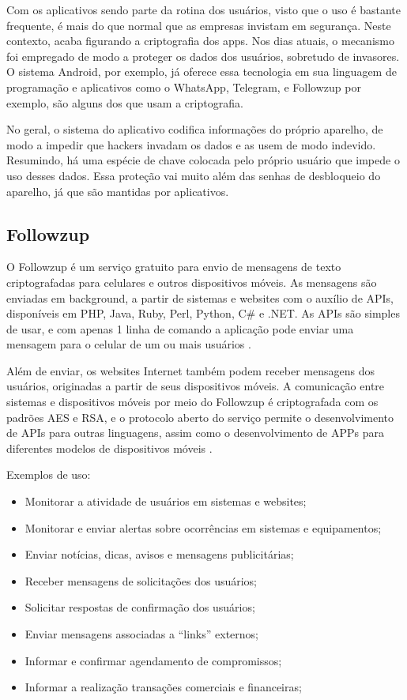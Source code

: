 \documentclass[12pt]{article}
\begin{document}
Com os aplicativos sendo parte da rotina dos usuários, visto que o uso é bastante frequente, é mais do que normal que as empresas invistam em segurança. Neste contexto, acaba figurando a criptografia dos apps. Nos dias atuais, o mecanismo foi empregado de modo a proteger os dados dos usuários, sobretudo de invasores. O sistema Android, por exemplo, já oferece essa tecnologia em sua linguagem de programação e aplicativos como o WhatsApp, Telegram, e Followzup por exemplo, são  alguns dos que usam a criptografia.

No geral, o sistema do aplicativo codifica informações do próprio aparelho, de modo a impedir que hackers invadam os dados e as usem de modo indevido. Resumindo, há uma espécie de chave colocada pelo próprio usuário que impede o uso desses dados. Essa proteção vai muito além das senhas de desbloqueio do aparelho, já que são mantidas por aplicativos.


\subsection{Followzup}

O Followzup é um serviço gratuito para envio de mensagens de texto criptografadas para celulares e outros dispositivos móveis. As mensagens são enviadas em background, a partir de sistemas e websites com o auxílio de APIs, disponíveis em PHP, Java, Ruby, Perl, Python,  C\# e .NET. As APIs são simples de usar, e com apenas 1 linha de comando a aplicação pode enviar uma mensagem para o celular de um ou mais usuários \cite{followzup}.
 
Além de enviar, os websites Internet também podem receber mensagens dos usuários, originadas a partir de seus dispositivos móveis. A comunicação entre sistemas e dispositivos móveis por meio do Followzup é criptografada com os padrões AES e RSA, e o protocolo aberto do serviço permite o desenvolvimento de APIs para outras linguagens, assim como o desenvolvimento de APPs para diferentes modelos de dispositivos móveis \cite{followzup}.

Exemplos de uso:
\begin{itemize}
    \item Monitorar a atividade de usuários em sistemas e websites;
    \item Monitorar e enviar alertas sobre ocorrências em sistemas e equipamentos;
    \item Enviar notícias, dicas, avisos e mensagens publicitárias;
    \item Receber mensagens de solicitações dos usuários;
    \item Solicitar respostas de confirmação dos usuários;
    \item Enviar mensagens associadas a “links” externos;
    \item Informar e confirmar agendamento de compromissos;
    \item Informar a realização transações comerciais e financeiras;
    
\end{itemize}
\end{document}
